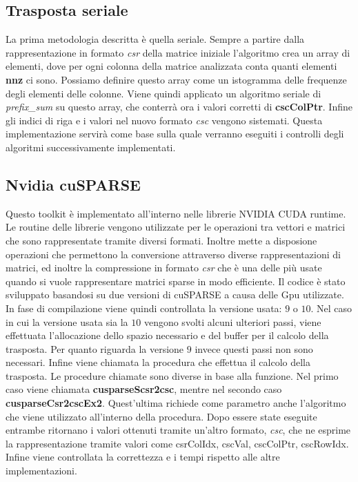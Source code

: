 \documentclass[]{IEEEtran}
\begin{document}
	\subsection{Trasposta seriale}
	La prima metodologia descritta è quella seriale. Sempre a partire dalla rappresentazione in formato \textit{csr} della matrice iniziale l'algoritmo crea un array di elementi, dove per ogni colonna della matrice analizzata conta quanti elementi \textbf{nnz} ci sono. Possiamo definire questo array come un istogramma delle frequenze degli elementi delle colonne. Viene quindi applicato un algoritmo seriale di \textit{prefix\_sum} su questo array, che conterrà ora i valori corretti di \textbf{cscColPtr}. Infine gli indici di riga e i valori nel nuovo formato \textit{csc} vengono sistemati.\newline
	Questa implementazione servirà come base sulla quale verranno eseguiti i controlli degli algoritmi successivamente implementati.
	
	\subsection{Nvidia cuSPARSE}
	Questo toolkit è implementato all'interno nelle librerie NVIDIA CUDA runtime. Le routine delle librerie vengono utilizzate per le operazioni tra vettori e matrici che sono rappresentate tramite diversi formati. Inoltre mette a disposione operazioni che permettono la conversione attraverso diverse rappresentazioni di matrici, ed inoltre la compressione in formato \textit{csr} che è una delle più usate quando si vuole rappresentare matrici sparse in modo efficiente.\newline	
	Il codice è stato sviluppato basandosi su due versioni di cuSPARSE a causa delle Gpu utilizzate. In fase di compilazione viene quindi controllata la versione usata: $ 9 $ o $ 10 $.\newline
	Nel caso in cui la versione usata sia la $ 10 $ vengono svolti alcuni ulteriori passi, viene effettuata l'allocazione dello spazio necessario e del buffer per il calcolo della trasposta. Per quanto riguarda la versione $ 9 $ invece questi passi non sono necessari.\newline
	Infine viene chiamata la procedura che effettua il calcolo della trasposta. \newline
	Le procedure chiamate sono diverse in base alla funzione. Nel primo caso viene chiamata \textbf{cusparseScsr2csc}, mentre nel secondo caso \textbf{cusparseCsr2cscEx2}. Quest'ultima richiede come parametro anche l'algoritmo che viene utilizzato all'interno della procedura.\newline
	Dopo essere state eseguite entrambe ritornano i valori ottenuti tramite un'altro formato, \textit{csc}, che ne esprime la rappresentazione tramite valori come csrColIdx, cscVal, cscColPtr, cscRowIdx. Infine viene controllata la correttezza e i tempi rispetto alle altre implementazioni.
\end{document}
